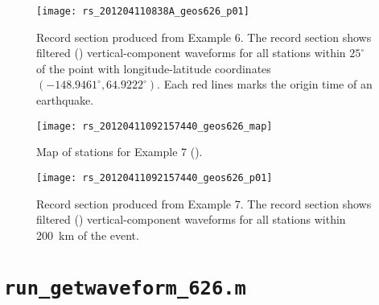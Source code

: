 \documentclass[11pt,titlepage,fleqn]{article}
\begin{document}
\clearpage\pagebreak
\begin{figure}
\hspace{-1.25cm}
\texttt{[image: rs\_201204110838A\_geos626\_p01]}
\caption[]
{{
Record section produced from Example 6.
The record section shows filtered () vertical-component waveforms for all stations within $25^\circ$ of the point with longitude-latitude coordinates $(-148.9461^\circ, 64.9222^\circ)$. Each red lines marks the origin time of an earthquake.
}}
\label{fig:rs_ex06}
\end{figure}


\clearpage\pagebreak
\begin{figure}
\centering
\texttt{[image: rs\_20120411092157440\_geos626\_map]}
\caption[]
{{
Map of stations for Example 7 ().
}}
\label{fig:map_ex07}
\end{figure}

\clearpage\pagebreak
\begin{figure}
\hspace{-1.25cm}
\texttt{[image: rs\_20120411092157440\_geos626\_p01]}
\caption[]
{{
Record section produced from Example 7.
The record section shows filtered () vertical-component waveforms for all stations within 200~km of the event.
}}
\label{fig:rs_ex07}
\end{figure}


\iffalse

\appendix

\clearpage\pagebreak

\section{{\tt run\_getwaveform\_626.m}}
\label{sec:script}
\end{document}

